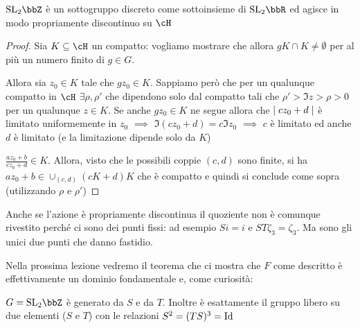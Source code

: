 \begin{lemma}
  $\SL_2 \bbZ$ è un sottogruppo discreto come sottoinsieme di $\SL_2 \bbR$
  ed agisce in modo propriamente discontinuo su $\cH$
\end{lemma}
\begin{proof}
  Sia $K \subseteq \cH$ un compatto: vogliamo mostrare che allora
  $gK \cap K \neq \emptyset$ per al più un numero finito di $g \in G$.

  Allora sia $z_0 \in K$ tale che $g z_0 \in K$. Sappiamo però che per
  un qualunque compatto in $\cH$ $\exists \rho, \rho'$ che dipendono
  solo dal compatto tali che $\rho' > \Im z > \rho > 0$ per un qualunque
  $z \in K$. Se anche $g z_0 \in K$ ne segue allora che $\mid cz_0 + d \mid$
  è limitato uniformemente in $z_0$ $\implies$
  $\Im (cz_0 + d) = c \Im z_0$ $\implies$ $c$ è limitato ed anche $d$ è
  limitato (e la limitazione dipende solo da $K$)

  $\frac{a z_0 + b}{c z_0 + d} \in K$. Allora, visto che le possibili
  coppie $(c, d)$ sono finite, si ha
  $a z_0 + b \in \cup_{(c, d)} (cK + d)K$ che è compatto e quindi si
  conclude come sopra (utilizzando $\rho$ e $\rho'$)
\end{proof}

Anche se l'azione è propriamente discontinua il quoziente non è comunque
rivestito perché ci sono dei punti fissi: ad esempio $Si = i$ e $ST
\zeta_3 = \zeta_3$. Ma sono gli unici due punti che danno fastidio.


Nella prossima lezione vedremo il teorema che ci mostra che $F$ come
descritto è effettivamente un dominio fondamentale e, come curiosità:
\begin{teorema}
  $G = \SL_2 \bbZ$ è generato da $S$ e da $T$. Inoltre è esattamente il
  gruppo libero su due elementi ($S$ e $T$) con le relazioni
  $S^2 = (TS)^3 = \text{Id}$
\end{teorema}

